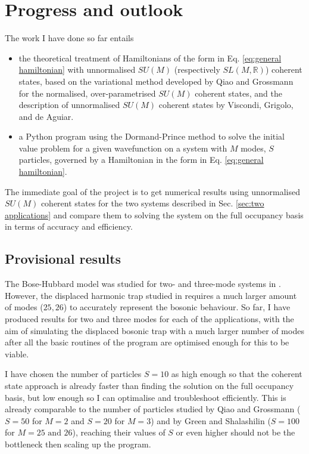 \documentclass[12pt]{article}
\begin{document}
	
	
	\section{Progress and outlook}
	The work I have done so far entails
	\begin{itemize}
		\item the theoretical treatment of Hamiltonians of the form in Eq. \ref{eq:general hamiltonian} with unnormalised $SU(M)$ (respectively $SL(M,\mathbb{R})$) coherent states, based on the variational method developed by Qiao and Grossmann for the normalised, over-parametrised $SU(M)$ coherent states, and the description of unnormalised $SU(M)$ coherent states by Viscondi, Grigolo, and de Aguiar.
		\item a Python program using the Dormand-Prince method to solve the initial value problem for a given wavefunction on a system with $M$ modes, $S$ particles, governed by a Hamiltonian in the form in Eq. \ref{eq:general hamiltonian}.
	\end{itemize}
	The immediate goal of the project is to get numerical results using unnormalised $SU(M)$ coherent states for the two systems described in Sec. \ref{sec:two applications} and compare them to solving the system on the full occupancy basis in terms of accuracy and efficiency.
	
	\subsection{Provisional results}
	The Bose-Hubbard model was studied for two- and three-mode systems in \cite{grossmann}. However, the displaced harmonic trap studied in \cite{green} requires a much larger amount of modes ($25,26$) to accurately represent the bosonic behaviour. So far, I have produced results for two and three modes for each of the applications, with the aim of simulating the displaced bosonic trap with a much larger number of modes after all the basic routines of the program are optimised enough for this to be viable.
	
	 I have chosen the number of particles $S=10$ as high enough so that the coherent state approach is already faster than finding the solution on the full occupancy basis, but low enough so I can optimalise and troubleshoot efficiently. This is already comparable to the number of particles studied by Qiao and Grossmann ($S=50$ for $M=2$ and $S=20$ for $M=3$) and by Green and Shalashilin ($S=100$ for $M=25\text{ and }26$), reaching their values of $S$ or even higher should not be the bottleneck then scaling up the program.
	 
\end{document}
